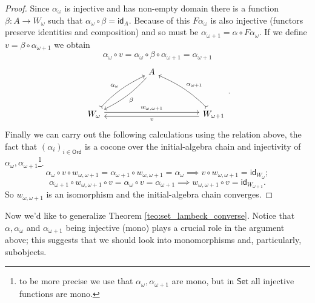 \documentclass[letterpaper, 11pt, oneside]{memoir}
\theoremstyle{myteo}
\numberwithin{equation}{section}
\newcommand{\id}{\textsf{id}}
\newcommand{\Ord}{\textsf{Ord}}
\newcommand{\Set}{\textsf{Set}}
\begin{document}
\begin{proof}
  Since \(\alpha_\omega\) is injective and has non-empty domain there is a function  \(\beta : A \to W_\omega\) such that \(\alpha_\omega \circ \beta = \id_A\).
  Because of this \(F\alpha_\omega\) is also injective (functors preserve identities and composition) and so must be \(\alpha_{\omega + 1} = \alpha \circ F\alpha_\omega\).
  If we define \(v = \beta \circ \alpha_{\omega + 1}\) we obtain
  \begin{equation*}
    \alpha_\omega \circ v = \alpha_\omega \circ \beta \circ \alpha_{\omega + 1} = \alpha_{\omega + 1}
  \end{equation*}
  \begin{equation*}
    \begin{tikzcd}[sep=huge]
      & A \ar[dl, bend left=10, "\beta"] &\\
      W_\omega \ar[rr, shift left=1, "w_{\omega, \omega + 1}"] \ar[ur, bend left=10, tail, "\alpha_\omega"] & & W_{\omega + 1} \ar[lu, bend right=10, tail, "\alpha_{\omega + 1}"'] \ar[ll, shift left=1, "v"]
    \end{tikzcd}.
  \end{equation*}
  Finally we can carry out the following calculations using the relation above, the fact that \((\alpha_i)_{i \in \Ord}\) is a cocone over the initial-algebra chain and injectivity of \(\alpha_\omega, \alpha_{\omega + 1}\)\footnote{to be more precise we use that \(\alpha_\omega, \alpha_{\omega +1}\) are mono, but in \(\Set\) all injective functions are mono.}.
  \begin{equation*}
     \alpha_\omega \circ v \circ w_{\omega, \omega + 1} = \alpha_{\omega + 1} \circ w_{\omega, \omega + 1} = \alpha_\omega \implies v \circ w_{\omega, \omega + 1} = \id_{W_\omega};
  \end{equation*}
  \begin{equation*}
    \alpha_{\omega + 1} \circ w_{\omega, \omega + 1} \circ v = \alpha_{\omega} \circ v = \alpha_{\omega + 1} \implies  w_{\omega, \omega + 1} \circ v = \id_{W_{\omega + 1}}.
  \end{equation*}
  So \(w_{\omega, \omega + 1}\) is an isomorphism and the initial-algebra chain converges.
\end{proof}

Now we'd like to generalize Theorem \ref{teo:set_lambeck_converse}.
Notice that \(\alpha, \alpha_\omega\) and \(\alpha_{\omega + 1}\) being injective (mono) plays a crucial role in the argument above; this suggests that we should look into monomorphisms and, particularly, subobjects.
\end{document}
